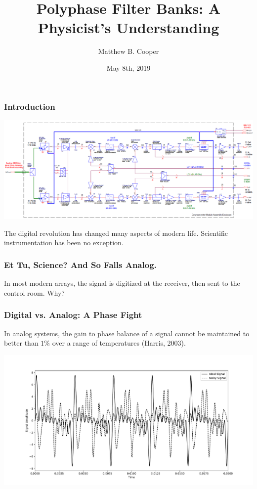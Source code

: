 \documentclass{beamer}
\title[About Beamer]
{Polyphase Filter Banks:  A Physicist's Understanding}
\author{Matthew B. Cooper}
\institute{New Jersey Institute of Technology}
\date{May 8th, 2019}
\begin{document}
 
\frame{\titlepage}
 
\begin{frame}
\frametitle{Introduction}
\includegraphics[scale=.25]{Figure_1.png}\footnotemark

\smallskip
The digital revolution has changed many aspects of modern life.  Scientific instrumentation has been no exception.  
\end{frame}

\begin{frame}
\frametitle{Et Tu, Science? And So Falls Analog.}
In most modern arrays, the signal is digitized at the receiver, then sent to the control room.  Why? 
\end{frame}

\begin{frame}
\frametitle{Digital vs. Analog: A Phase Fight}
In analog systems, the gain to phase balance of a signal cannot be maintained to better than $1\%$ over a range of temperatures (Harris, 2003).\footnotemark

\includegraphics[scale=.3]{Figure_2.pdf}
\end{frame}
\end{document}
